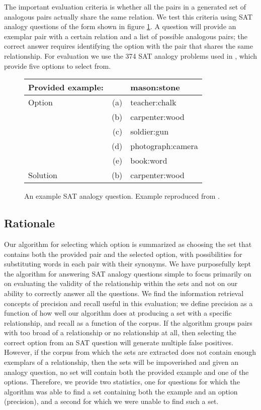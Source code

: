 \documentclass[11pt]{article}
\begin{document}
The important evaluation criteria is whether all the pairs in a generated set of
analogous pairs actually share the same relation.  We test this criteria using
SAT analogy questions of the form shown in figure \ref{fig:sat-question}.  A
question will provide an exemplar pair with a certain relation and a list of
possible analogous pairs; the correct answer requires identifying the option
with the pair that shares the same relationship.  For evaluation we use the 374
SAT analogy problems used in \cite{turney03combining}, which provide five
options to select from.  

\begin{figure}
  \begin{tabular}{lrl}
    \hline
    Provided example: & & mason:stone \\
    \hline
    Option & (a) & teacher:chalk \\
    & (b) & carpenter:wood  \\
    & (c) & soldier:gun \\
    & (d) & photograph:camera \\
    & (e) & book:word \\
    Solution & (b) & carpenter:wood  \\
    \hline
  \end{tabular}
  \caption{An example SAT analogy question.  Example reproduced from
    \cite{turney03combining}.}
  \label{fig:sat-question}
\end{figure}

\subsection{Rationale}

Our algorithm for selecting which option is summarized as choosing the set that
contains both the provided pair and the selected option, with possibilities for
substituting words in each pair with their synonyms.  We have purposefully kept
the algorithm for answering SAT analogy questions simple to focus primarily on
on evaluating the validity of the relationship within the sets and not on our
ability to correctly answer all the questions.  We find the information
retrieval concepts of precision and recall useful in this evaluation; we define
precision as a function of how well our algorithm does at producing a set with a
specific relationship, and recall as a function of the corpus.  If the algorithm
groups pairs with too broad of a relationship or no relationship at all, then
selecting the correct option from an SAT question will generate multiple false
positives.  However, if the corpus from which the sets are extracted does not
contain enough exemplars of a relationship, then the sets will be impoverished
and given an analogy question, no set will contain both the provided example and
one of the options.  Therefore, we provide two statistics, one for questions for
which the algorithm was able to find a set containing both the example and an
option (precision), and a second for which we were unable to find such a set.
\end{document}
